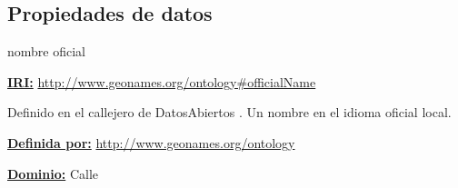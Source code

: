 \subsection{Propiedades de datos}




\begin{mybox}{nombre oficial}
\begin{flushleft}
\underline{\textbf{IRI:}}
\url{http://www.geonames.org/ontology#officialName}
\newline

Definido en el callejero de DatosAbiertos \cite{ciudadesbiertas_callejero}.
Un nombre en el idioma oficial local.
\newline


\underline{\textbf{Definida por:}}
\url{http://www.geonames.org/ontology}
\newline

\underline{\textbf{Dominio:}}
	Calle
\newline


\end{flushleft}
\end{mybox}





